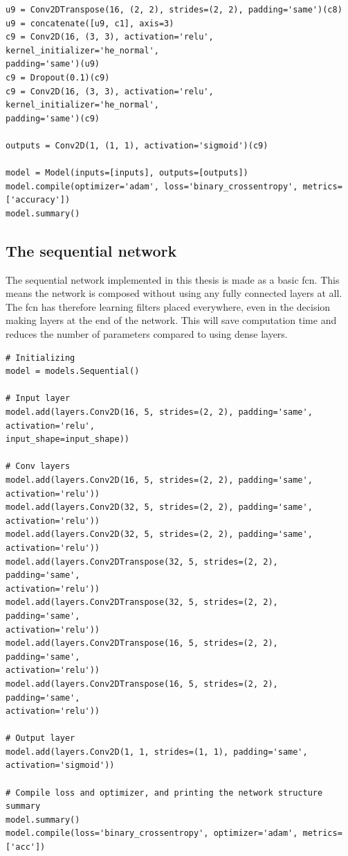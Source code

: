 \documentclass[USenglish]{ifimaster}  %
\begin{document}
\begin{verbatim}
u9 = Conv2DTranspose(16, (2, 2), strides=(2, 2), padding='same')(c8)
u9 = concatenate([u9, c1], axis=3)
c9 = Conv2D(16, (3, 3), activation='relu', kernel_initializer='he_normal', 
padding='same')(u9)
c9 = Dropout(0.1)(c9)
c9 = Conv2D(16, (3, 3), activation='relu', kernel_initializer='he_normal', 
padding='same')(c9)

outputs = Conv2D(1, (1, 1), activation='sigmoid')(c9)

model = Model(inputs=[inputs], outputs=[outputs])
model.compile(optimizer='adam', loss='binary_crossentropy', metrics=['accuracy'])
model.summary()

\end{verbatim}


\subsection{The sequential network}
The sequential network implemented in this thesis is made as a basic \ac{fcn}. This means the network is composed without using any fully connected layers at all. The \ac{fcn} has therefore learning filters placed everywhere, even in the decision making layers at the end of the network. This will save computation time and reduces the number of parameters compared to using dense layers.

\begin{verbatim}
# Initializing
model = models.Sequential()

# Input layer
model.add(layers.Conv2D(16, 5, strides=(2, 2), padding='same', activation='relu', 
input_shape=input_shape))

# Conv layers
model.add(layers.Conv2D(16, 5, strides=(2, 2), padding='same', activation='relu'))
model.add(layers.Conv2D(32, 5, strides=(2, 2), padding='same', activation='relu'))
model.add(layers.Conv2D(32, 5, strides=(2, 2), padding='same', activation='relu'))
model.add(layers.Conv2DTranspose(32, 5, strides=(2, 2), padding='same', 
activation='relu'))
model.add(layers.Conv2DTranspose(32, 5, strides=(2, 2), padding='same', 
activation='relu'))
model.add(layers.Conv2DTranspose(16, 5, strides=(2, 2), padding='same', 
activation='relu'))
model.add(layers.Conv2DTranspose(16, 5, strides=(2, 2), padding='same', 
activation='relu'))

# Output layer
model.add(layers.Conv2D(1, 1, strides=(1, 1), padding='same', activation='sigmoid'))

# Compile loss and optimizer, and printing the network structure summary
model.summary()
model.compile(loss='binary_crossentropy', optimizer='adam', metrics=['acc'])
\end{verbatim}
\end{document}
